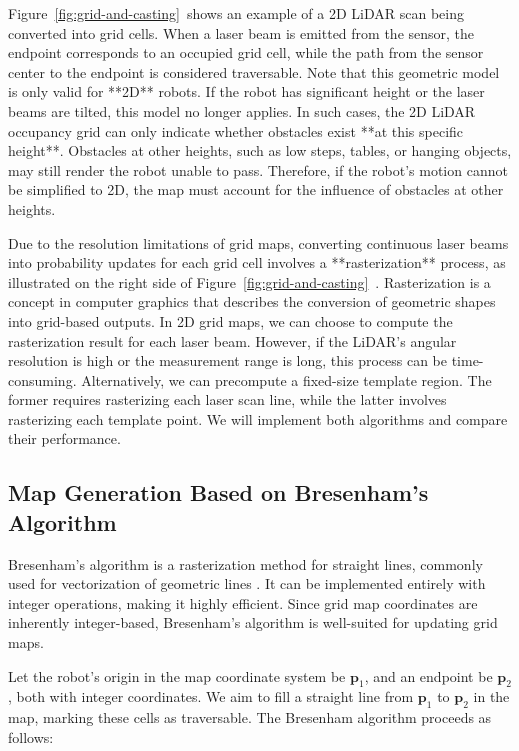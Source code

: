 Figure~\ref{fig:grid-and-casting}~shows an example of a 2D LiDAR scan being converted into grid cells. When a laser beam is emitted from the sensor, the endpoint corresponds to an occupied grid cell, while the path from the sensor center to the endpoint is considered traversable. Note that this geometric model is only valid for **2D** robots. If the robot has significant height or the laser beams are tilted, this model no longer applies. In such cases, the 2D LiDAR occupancy grid can only indicate whether obstacles exist **at this specific height**. Obstacles at other heights, such as low steps, tables, or hanging objects, may still render the robot unable to pass. Therefore, if the robot's motion cannot be simplified to 2D, the map must account for the influence of obstacles at other heights.  

Due to the resolution limitations of grid maps, converting continuous laser beams into probability updates for each grid cell involves a **rasterization** process, as illustrated on the right side of Figure~\ref{fig:grid-and-casting}~. Rasterization is a concept in computer graphics that describes the conversion of geometric shapes into grid-based outputs. In 2D grid maps, we can choose to compute the rasterization result for each laser beam. However, if the LiDAR's angular resolution is high or the measurement range is long, this process can be time-consuming. Alternatively, we can precompute a fixed-size template region. The former requires rasterizing each laser scan line, while the latter involves rasterizing each template point. We will implement both algorithms and compare their performance.

\subsection{Map Generation Based on Bresenham's Algorithm}  
Bresenham's algorithm is a rasterization method for straight lines, commonly used for vectorization of geometric lines \cite{Cohen-Or1997}. It can be implemented entirely with integer operations, making it highly efficient. Since grid map coordinates are inherently integer-based, Bresenham's algorithm is well-suited for updating grid maps.  

Let the robot's origin in the map coordinate system be $\bm{p}_1$, and an endpoint be $\bm{p}_2$, both with integer coordinates. We aim to fill a straight line from $\bm{p}_1$ to $\bm{p}_2$ in the map, marking these cells as traversable. The Bresenham algorithm proceeds as follows:  

